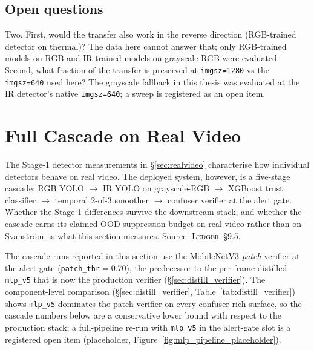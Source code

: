 \documentclass[12pt,a4paper,oneside,openright]{book}
\begin{document}
\subsection{Open questions}

Two. First, would the transfer also work in the reverse direction (RGB-trained detector on thermal)? The data here cannot answer that; only RGB-trained models on RGB and IR-trained models on grayscale-RGB were evaluated. Second, what fraction of the transfer is preserved at \texttt{imgsz=1280} vs the \texttt{imgsz=640} used here? The grayscale fallback in this thesis was evaluated at the IR detector's native \texttt{imgsz=640}; a sweep is registered as an open item.

\section{Full Cascade on Real Video}
\label{sec:realvideo_cascade}

The Stage-1 detector measurements in \S\ref{sec:realvideo} characterise how individual detectors behave on real video. The deployed system, however, is a five-stage cascade: RGB YOLO $\to$ IR YOLO on grayscale-RGB $\to$ XGBoost trust classifier $\to$ temporal 2-of-3 smoother $\to$ confuser verifier at the alert gate. Whether the Stage-1 differences survive the downstream stack, and whether the cascade earns its claimed OOD-suppression budget on real video rather than on Svanstr\"om, is what this section measures. Source: \textsc{Ledger}~\S9.5.

The cascade runs reported in this section use the MobileNetV3 \emph{patch} verifier at the alert gate (\texttt{patch\_thr}$=$0.70), the predecessor to the per-frame distilled \texttt{mlp\_v5} that is now the production verifier (\S\ref{sec:distill_verifier}). The component-level comparison (\S\ref{sec:distill_verifier}, Table~\ref{tab:distill_verifier}) shows \texttt{mlp\_v5} dominates the patch verifier on every confuser-rich surface, so the cascade numbers below are a conservative lower bound with respect to the production stack; a full-pipeline re-run with \texttt{mlp\_v5} in the alert-gate slot is a registered open item (placeholder, Figure~\ref{fig:mlp_pipeline_placeholder}).
\end{document}
